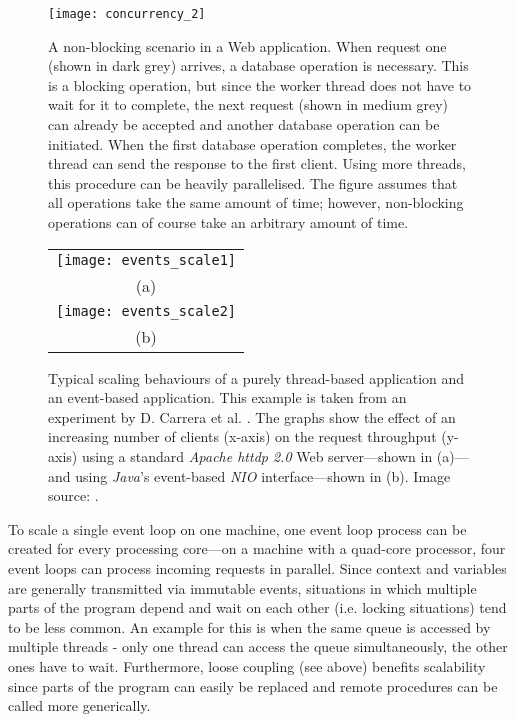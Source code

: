 \begin{figure}
\centering\small
\setlength{\tabcolsep}{0mm}
  \texttt{[image: concurrency\_2]}
\caption{
A non-blocking scenario in a Web application. When request one (shown in dark grey) arrives, a database operation is necessary. This is a blocking operation, but since the worker thread does not have to wait for it to complete, the next request (shown in medium grey) can already be accepted and another database operation can be initiated. When the first database operation completes, the worker thread can send the response to the first client. Using more threads, this procedure can be heavily parallelised. The figure assumes that all operations take the same amount of time; however, non-blocking operations can of course take an arbitrary amount of time.
}
\label{fig:concurrency_2}
\end{figure}

\begin{figure}
\centering\small
\begin{tabular}{c@{\hspace{12mm}}}
  \texttt{[image: events\_scale1]} \\
  (a)
\\[14pt]
  \texttt{[image: events\_scale2]} \\
  (b)
\end{tabular}
\caption{Typical scaling behaviours of a purely thread-based application and an event-based application. This example is taken from an experiment by D. Carrera et al. \cite{Carrera}. The graphs show the effect of an increasing number of clients (x-axis) on the request throughput (y-axis) using a standard \textit{Apache httdp 2.0} Web server---shown in (a)---and using \textit{Java}'s event-based \textit{NIO} interface---shown in (b). Image source: \cite{Carrera}.}
\label{fig:events_scale}
\end{figure}
 
To scale a single event loop on one machine, one event loop process can be created for every processing core---on a machine with a quad-core processor, four event loops can process incoming requests in parallel. Since context and variables are generally transmitted via immutable events, situations in which multiple parts of the program depend and wait on each other (i.e. locking situations) tend to be less common. An example for this is when the same queue is accessed by multiple threads - only one thread can access the queue simultaneously, the other ones have to wait. Furthermore, loose coupling (see above) benefits scalability since parts of the program can easily be replaced and remote procedures can be called more generically.

